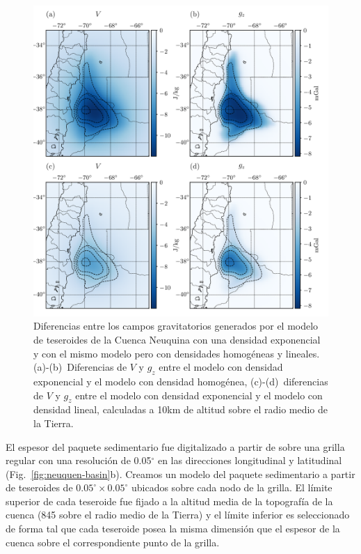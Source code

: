 \begin{figure}
\centering
\includegraphics[width=\linewidth]{figs/tesseroids-variable-density/neuquen-basin-diffs.png}
\caption{
    Diferencias entre los campos gravitatorios generados por el modelo de
    teseroides de la Cuenca Neuquina con una densidad exponencial y con el
    mismo modelo pero con densidades homogéneas y lineales.
    \mbox{(a)-(b)}~Diferencias de $V$ y $g_z$ entre el modelo con densidad
    exponencial y el modelo con densidad homogénea,
    \mbox{(c)-(d)}~diferencias de $V$ y $g_z$ entre el modelo con densidad
    exponencial y el modelo con densidad lineal,
    calculadas a 10km de altitud sobre el radio medio de la Tierra.
}
\label{fig:neuquen-basin-diffs}
\end{figure}

El espesor del paquete sedimentario fue digitalizado a partir de
\citet{heine2007} sobre una grilla regular con una resolución de 0.05$^\circ$
en las direcciones longitudinal y latitudinal (Fig.~\ref{fig:neuquen-basin}b).
Creamos un modelo del paquete sedimentario a partir de teseroides de
$0.05^\circ \times 0.05^\circ$ ubicados sobre cada nodo de la grilla.
El límite superior de cada teseroide fue fijado a la altitud media de la
topografía de la cuenca (845\m{} sobre el radio medio de la Tierra) y el límite
inferior es seleccionado de forma tal que cada teseroide posea la misma
dimensión que el espesor de la cuenca sobre el correspondiente punto de la
grilla.

